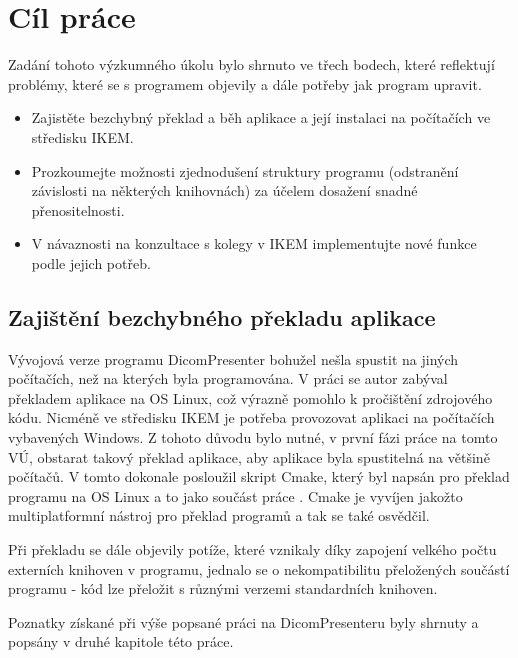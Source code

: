 \chapter*{Cíl práce}
Zadání tohoto výzkumného úkolu bylo shrnuto ve třech bodech, které reflektují problémy, které se s programem objevily a dále potřeby jak program upravit.

\begin{itemize}
\item Zajistěte bezchybný překlad a běh aplikace a její instalaci na počítačích ve středisku IKEM.
\item Prozkoumejte možnosti zjednodušení struktury programu (odstranění závislosti na některých knihovnách) za účelem dosažení snadné přenositelnosti.
\item V návaznosti na konzultace s kolegy v IKEM implementujte nové funkce podle jejich potřeb.
\end{itemize}

\section*{Zajištění bezchybného překladu aplikace}
Vývojová verze programu DicomPresenter bohužel nešla spustit na jiných počítačích, než na kterých byla programována. V práci \cite{flaska} se autor zabýval překladem aplikace na OS Linux, což výrazně pomohlo k pročištění zdrojového kódu. Nicméně ve středisku IKEM je potřeba provozovat aplikaci na počítačích vybavených Windows. Z tohoto důvodu bylo nutné, v první fázi práce na tomto VÚ, obstarat takový překlad aplikace, aby aplikace byla spustitelná na většině počítačů. V tomto dokonale posloužil skript Cmake, který byl napsán pro překlad programu na OS Linux a to jako součást práce \cite{flaska}. Cmake je vyvíjen jakožto multiplatformní nástroj pro překlad programů a tak se také osvědčil. 

Při překladu se dále objevily potíže, které vznikaly díky zapojení velkého počtu externích knihoven v programu, jednalo se o nekompatibilitu přeložených součástí programu - kód lze přeložit s různými verzemi standardních knihoven.

Poznatky získané při výše popsané práci na DicomPresenteru byly shrnuty a popsány v druhé kapitole této práce.

